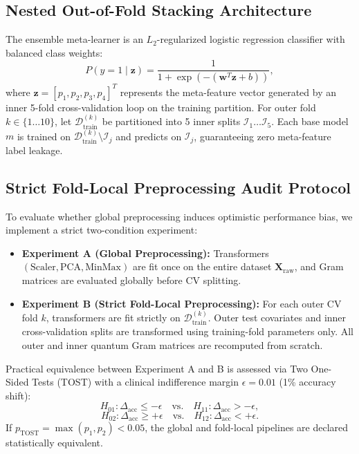 \documentclass[journal,twocolumn]{IEEEtran}
\begin{document}
\subsection{Nested Out-of-Fold Stacking Architecture}
The ensemble meta-learner is an $L_2$-regularized logistic regression classifier with balanced class weights:
\begin{equation}
P(y=1 \mid \mathbf{z}) = \frac{1}{1 + \exp\left(-(\mathbf{w}^T \mathbf{z} + b)\right)},
\end{equation}
where $\mathbf{z} = [p_1, p_2, p_3, p_4]^T$ represents the meta-feature vector generated by an inner 5-fold cross-validation loop on the training partition. For outer fold $k \in \{1 \dots 10\}$, let $\mathcal{D}_{\text{train}}^{(k)}$ be partitioned into 5 inner splits $\mathcal{I}_1 \dots \mathcal{I}_5$. Each base model $m$ is trained on $\mathcal{D}_{\text{train}}^{(k)} \setminus \mathcal{I}_j$ and predicts on $\mathcal{I}_j$, guaranteeing zero meta-feature label leakage.

\subsection{Strict Fold-Local Preprocessing Audit Protocol}
To evaluate whether global preprocessing induces optimistic performance bias, we implement a strict two-condition experiment:
\begin{itemize}
    \item \textbf{Experiment A (Global Preprocessing):} Transformers $(\text{Scaler}, \text{PCA}, \text{MinMax})$ are fit once on the entire dataset $\mathbf{X}_{\text{raw}}$, and Gram matrices are evaluated globally before CV splitting.
    \item \textbf{Experiment B (Strict Fold-Local Preprocessing):} For each outer CV fold $k$, transformers are fit strictly on $\mathcal{D}_{\text{train}}^{(k)}$. Outer test covariates and inner cross-validation splits are transformed using training-fold parameters only. All outer and inner quantum Gram matrices are recomputed from scratch.
\end{itemize}
Practical equivalence between Experiment A and B is assessed via Two One-Sided Tests (TOST) with a clinical indifference margin $\epsilon = 0.01$ (1\% accuracy shift):
\begin{equation}
H_{01}: \Delta_{\text{acc}} \le -\epsilon \quad \text{vs.} \quad H_{11}: \Delta_{\text{acc}} > -\epsilon,
\end{equation}
\begin{equation}
H_{02}: \Delta_{\text{acc}} \ge +\epsilon \quad \text{vs.} \quad H_{12}: \Delta_{\text{acc}} < +\epsilon.
\end{equation}
If $p_{\text{TOST}} = \max(p_1, p_2) < 0.05$, the global and fold-local pipelines are declared statistically equivalent.
\end{document}
